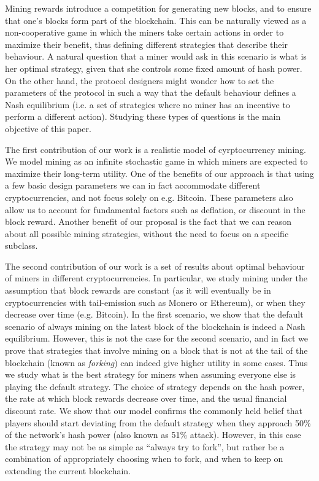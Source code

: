 Mining rewards introduce a competition for generating new blocks, and to ensure that one's blocks form part of the blockchain. This can be naturally viewed as a non-cooperative game in which the miners take certain actions in order to maximize their benefit, thus defining different strategies that describe their behaviour. A natural question
that a miner would ask in this scenario is what is her optimal strategy, given that she controls some fixed amount of hash power. On the other hand, the protocol designers might wonder how to set the parameters of the protocol in such a way that the default behaviour defines a Nash equilibrium (i.e. a set of strategies where no miner has an incentive to perform a different action). Studying these types of questions is the main objective of this paper.

\smallskip
{} The first contribution of our work is a realistic model of cyrptocurrency mining. We model mining as an infinite stochastic game in which miners are expected to maximize their long-term utility. One of the benefits of our approach is that using  a few basic design parameters we can in fact accommodate different cryptocurrencies, and not focus solely on e.g. Bitcoin. These parameters also allow us to account for fundamental factors such as deflation, or discount in the block reward. Another benefit of our proposal is the fact that we can reason about all possible mining strategies, without the need to focus on a specific subclass.

The second contribution of our work is a set of results about optimal behaviour of miners in different cryptocurrencies. In particular, we study mining under the assumption that block rewards are constant (as it will eventually be in cryptocurrencies with tail-emission such as Monero or Ethereum), or when they decrease over time (e.g. Bitcoin). In the first scenario, we show that the default scenario of always mining on the latest block of the blockchain is indeed a Nash equilibrium. However, this is not the case for the second scenario, and in fact we 
prove that strategies that involve mining on a block that is not at the tail of the blockchain (known as \emph{forking}) can indeed give higher utility in some cases. Thus we study 
what is the best strategy for miners when assuming everyone else is playing the default strategy. The choice of strategy depends on the hash power, the rate at which 
block rewards decrease over time, and the usual financial discount rate. We show that our model confirms the commonly held belief that players should start deviating from the default strategy 
when they approach 50\% of the network's hash power (also known as 51\% attack). However, in this case the strategy may not be as simple as ``always try to fork'', but rather be a combination 
of appropriately choosing when to fork, and when to keep on extending the current blockchain. 


